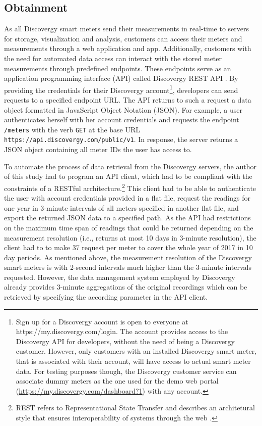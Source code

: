 
\subsection{Obtainment}\label{Sec:Data;Subsec:Obtainment}

As all Discovergy smart meters send their measurements in real-time to servers for storage, visualization and analysis, customers can access their meters and measurements through a web application and app. Additionally, customers with the need for automated data access can interact with the stored meter measurements through predefined endpoints. These endpoints serve as an application programming interface (API) called Discovergy REST API \citep{DiscovergyAPI:2018}. By providing the credentials for their Discovergy account\footnote{Sign up for a Discovergy account is open to everyone at https://my.discovergy.com/login. The account provides access to the Discovergy API for developers, without the need of being a Discovergy customer. However, only customers with an installed Discovergy smart meter, that is associated with their account, will have access to actual smart meter data. For testing purposes though, the Discovergy customer service can associate dummy meters as the one used for the demo web portal (\href{https://my.discovergy.com/dashboard?1}{https://my.discovergy.com/dashboard?1}) with any account.}, developers can send requests to a specified endpoint URL. The API returns to such a request a data object formatted in JavaScript Object Notation (JSON). For example, a user authenticates herself with her account credentials and requests the endpoint \texttt{/meters} with the verb \texttt{GET} at the base URL \texttt{https://api.discovergy.com/public/v1}. In response, the server returns a JSON object containing all meter IDs the user has access to.

To automate the process of data retrieval from the Discovergy servers, the author of this study had to program an API client, which had to be compliant with the constraints of a RESTful architecture.\footnote{REST refers to Representational State Transfer and describes an architetural style that ensures interoperability of systems through the web \cite[][Ch. 5]{fielding:2000}.} This client had to be able to authenticate the user with account credentials provided in a flat file, request the readings for one year in 3-minute intervals of all meters specified in another flat file, and export the returned JSON data to a specified path. As the API had restrictions on the maximum time span of readings that could be returned depending on the measurement resolution (i.e., returns at most 10 days in 3-minute resolution), the client had to to make 37 request per meter to cover the whole year of 2017 in 10 day periods. As mentioned above, the measurement resolution of the Discovergy smart meters is with 2-second intervals much higher than the 3-minute intervals requested. However, the data management system employed by Discovergy already provides 3-minute aggregations of the original recordings which can be retrieved by specifying the according parameter in the API client.

